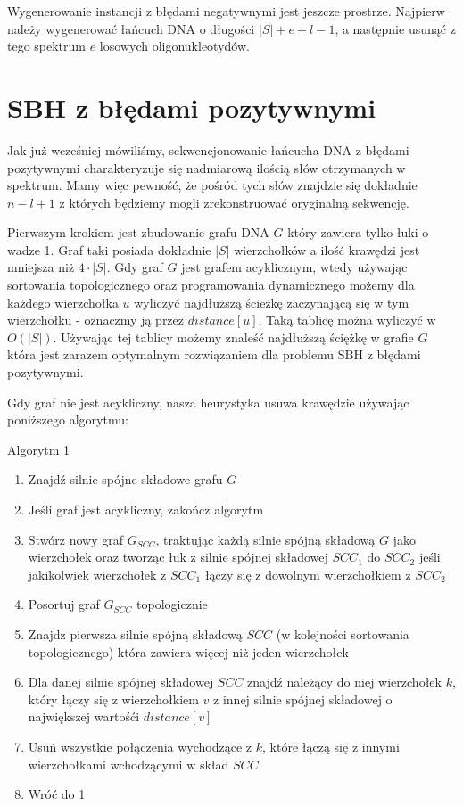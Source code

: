 \documentclass[a4paper,10pt]{article}
\begin{document}
Wygenerowanie instancji z błędami negatywnymi jest jeszcze prostrze. Najpierw należy
wygenerować łańcuch DNA o długości $|S|+e+l-1$, a następnie usunąć z tego spektrum
$e$ losowych oligonukleotydów.

\section{SBH z błędami pozytywnymi}
Jak już wcześniej mówiliśmy, sekwencjonowanie łańcucha DNA z błędami pozytywnymi charakteryzuje się
nadmiarową ilością słów otrzymanych w spektrum. Mamy więc pewność, że pośród tych słów znajdzie się dokładnie $n-l+1$ z których będziemy mogli zrekonstruować oryginalną sekwencję.

Pierwszym krokiem jest zbudowanie grafu DNA $G$ który zawiera tylko łuki o wadze 1. Graf taki posiada dokładnie $|S|$ wierzchołków a ilość krawędzi jest mniejsza niż $4 \cdot |S|$.
Gdy graf $G$ jest grafem acyklicznym, wtedy używając sortowania topologicznego oraz programowania dynamicznego możemy dla każdego wierzchołka $u$ wyliczyć 
najdłuższą ścieżkę zaczynającą się w tym wierzchołku - oznaczmy ją przez $distance[u]$. Taką tablicę można wyliczyć w $O(|S|)$. Używając tej tablicy 
możemy znaleść najdłuższą ściężkę w grafie $G$ która jest zarazem optymalnym rozwiązaniem dla problemu SBH z błędami pozytywnymi.

Gdy graf nie jest acykliczny, nasza heurystyka usuwa krawędzie używając poniższego algorytmu:

Algorytm 1
\begin{enumerate}
 \item Znajdź silnie spójne składowe grafu $G$
 \item Jeśli graf jest acykliczny, zakończ algorytm
 \item Stwórz nowy graf $G_{SCC}$, traktując każdą silnie spójną składową $G$ jako wierzchołek oraz
       tworząc łuk z silnie spójnej składowej $SCC_1$ do $SCC_2$ jeśli jakikolwiek wierzchołek z $SCC_1$ łączy się z dowolnym wierzchołkiem z $SCC_2$
 \item Posortuj graf $G_{SCC}$ topologicznie
 \item Znajdz pierwsza silnie spójną składową $SCC$ (w kolejności sortowania topologicznego) która zawiera więcej niż jeden wierzchołek
 \item Dla danej silnie spójnej składowej $SCC$ znajdź należący do niej wierzchołek $k$, który łączy się z wierzchołkiem $v$ z 
       innej silnie spójnej składowej o największej wartośći $distance[v]$
 \item Usuń wszystkie połączenia wychodzące z $k$, które łączą się z innymi wierzchołkami wchodzącymi w skład $SCC$
 \item Wróć do 1
\end{enumerate}
\end{document}
